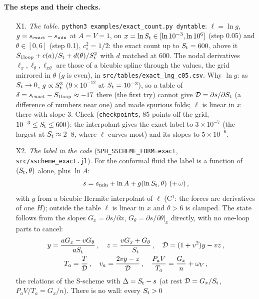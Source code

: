 \documentclass[11pt,aps,preprint,nofootinbib,superscriptaddress,tightenlines]{revtex4-2}
\def\st{\begin{equation}}
\def\stp{\end{equation}}
\let\oldparagraph\paragraph
\renewcommand{\paragraph}{\par\bigskip\oldparagraph}
\begin{document}
\paragraph{The steps and their checks.}
\begin{enumerate}
\item[X1.] \emph{The table.}  \texttt{python3 examples/exact\_count.py dyntable}: $\ell=\ln g$, $g=s_{\rm exact}-s_{\rm min}$ at $A=V=1$, on
  $x=\ln S_{\rm t}\in[\ln10^{-3},\ln10^6]$ (step 0.05) and $\theta\in[0,6]$ (step 0.1), $c_s^2=1/2$: the exact count up to $S_{\rm t}=600$, above it
  $S_{\rm 1loop}+c(a)/S_{\rm t}+d(\theta)/S_{\rm t}^2$ with $d$ matched at 600.  The nodal derivatives $\ell_x,\ell_\theta,\ell_{x\theta}$ are those of a
  bicubic spline through the values, the grid mirrored in $\theta$ ($g$ is even), in \texttt{src/tables/exact\_lng\_c05.csv}.  Why $\ln g$: as
  $S_{\rm t}\to0$, $g\propto S_{\rm t}^3$ ($9\times10^{-12}$ at $S_{\rm t}=10^{-3}$), so a table of $\delta=s_{\rm exact}-S_{\rm 1loop}\approx-17$ there
  (the first try) cannot give $\mathcal D=\partial s/\partial S_{\rm t}$ (a difference of numbers near one) and made spurious folds; $\ell$ is linear in
  $x$ there with slope 3.  Check (\texttt{checkpoints}, 85 points off the grid, $10^{-3}\le S_{\rm t}\le600$): the interpolant gives the exact
  label to $3\times10^{-7}$ (the largest at $S_{\rm t}\approx2$--8, where $\ell$ curves most) and its slopes to $5\times10^{-6}$.
\item[X2.] \emph{The label in the code} (\texttt{SPH\_SSCHEME\_FORM=exact}, \nolinkurl{src/sscheme_exact.jl}).  For the conformal fluid the label is a
  function of $(S_{\rm t},\theta)$ alone, plus $\ln A$:
  \st
  s=s_{\rm min}+\ln A+g(\ln S_{\rm t},\theta)\ (+\,\omega)\,,
  \stp
  with $g$ from a bicubic Hermite interpolant of $\ell$ (C$^1$: the forces are derivatives of one $H$); outside the table $\ell$ is linear in $x$ and
  $\theta>6$ is clamped.  The state follows from the slopes $G_x=\partial s/\partial x$, $G_\theta=\partial s/\partial\theta|_x$ directly, with no one-loop
  parts to cancel:
  \st
  \begin{gathered}
  y=\frac{aG_x-vG_\theta}{aS_{\rm t}}\,,\quad z=\frac{vG_x+G_\theta}{S_{\rm t}}\,,\quad\mathcal D=(1+v^2)y-vz\,,\\
  T_a=\frac T{\mathcal D}\,,\quad v_a=\frac{2vy-z}{\mathcal D}\,,\quad\frac{P_aV}{T_a}=\frac{G_x}n+\omega_V\,,
  \end{gathered}
  \stp
  the relations of the S-scheme with $\Delta=S_{\rm t}-s$ (at rest $\mathcal D=G_x/S_{\rm t}$, $P_aV/T_a=G_x/n$).  There is no wall: every $S_{\rm t}>0$

\end{enumerate}
\end{document}
